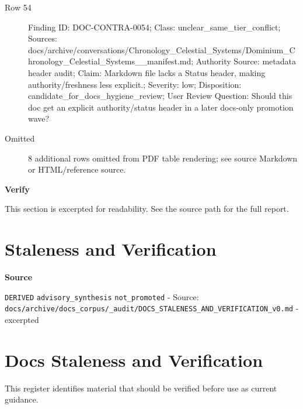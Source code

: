 \documentclass[10.5pt,a4paper,openany]{book}
\newcommand{\vonecallout}[3]{\par\medskip\noindent\begingroup\setlength{\fboxsep}{7pt}\colorbox{DomCalloutBg}{\parbox{0.94\linewidth}{\textbf{\textcolor{#1}{#2}}\par #3}}\endgroup\par\medskip}
\begin{document}
\begin{description}
\item[Row 54] Finding ID: DOC-\allowbreak{}CONTRA-\allowbreak{}0054; Class: unclear\_\allowbreak{}same\_\allowbreak{}tier\_\allowbreak{}conflict; Sources: docs/\allowbreak{}archive/\allowbreak{}conversations/\allowbreak{}Chronology\_\allowbreak{}Celestial\_\allowbreak{}Systems/\allowbreak{}Dominium\_\allowbreak{}Chronology\_\allowbreak{}Celestial\_\allowbreak{}Systems\_\allowbreak{}\_\allowbreak{}manifest.\allowbreak{}md; Authority Source: metadata header audit; Claim: Markdown file lacks a Status header, making authority/\allowbreak{}freshness less explicit.\allowbreak{}; Severity: low; Disposition: candidate\_\allowbreak{}for\_\allowbreak{}docs\_\allowbreak{}hygiene\_\allowbreak{}review; User Review Question: Should this doc get an explicit authority/\allowbreak{}status header in a later docs-\allowbreak{}only promotion wave?
\item[Omitted] 8 additional rows omitted from PDF table rendering; see source Markdown or HTML/\allowbreak{}reference source.\allowbreak{}
\end{description}

\vonecallout{DomAmber}{Verify}{This section is excerpted for readability.\allowbreak{} See the source path for the full report.\allowbreak{}}



\section{Staleness and Verification}

\vonecallout{DomSlate}{Source}{\texttt{DERIVED} \texttt{advisory\_\allowbreak{}synthesis} \texttt{not\_\allowbreak{}promoted} -\allowbreak{} Source: \texttt{docs/\allowbreak{}archive/\allowbreak{}docs\_\allowbreak{}corpus/\allowbreak{}\_\allowbreak{}audit/\allowbreak{}DOCS\_\allowbreak{}STALENESS\_\allowbreak{}AND\_\allowbreak{}VERIFICATION\_\allowbreak{}v0.\allowbreak{}md} -\allowbreak{} excerpted}

\section{Docs Staleness and Verification}

This register identifies material that should be verified before use as current guidance.\allowbreak{}
\end{document}
